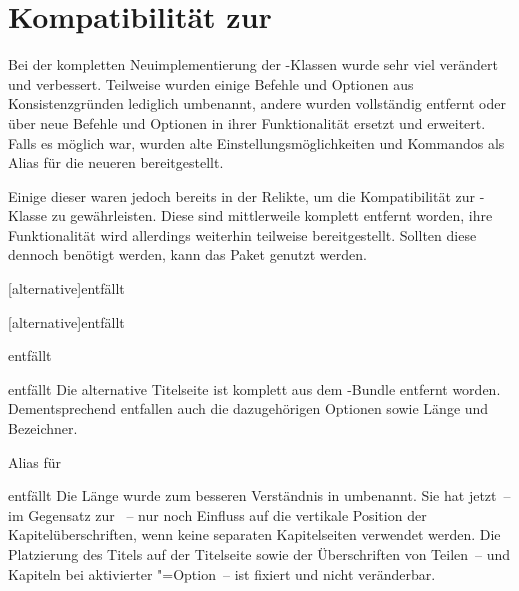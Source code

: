 \documentclass[%
  english,ngerman,%
  headings=optiontoheadandtoc,captions=tableheading,numbers=noenddot,%
  chapterpage,cdfoot,%
]{tudscrman}
\begin{document}
\section{Kompatibilität zur \vTUD}\label{sec:comp}
%

Bei der kompletten Neuimplementierung der \TUDScript-Klassen wurde sehr viel 
verändert und verbessert. Teilweise wurden einige Befehle und Optionen aus 
Konsistenzgründen lediglich umbenannt, andere wurden vollständig entfernt oder 
über neue Befehle und Optionen in ihrer Funktionalität ersetzt und erweitert. 
Falls es möglich war, wurden alte Einstellungsmöglichkeiten und Kommandos als 
Alias für die neueren bereitgestellt.

Einige dieser waren jedoch bereits in der \vTUD Relikte, um die Kompatibilität 
zur -Klasse zu gewährleisten. Diese sind mittlerweile komplett 
entfernt worden, ihre Funktionalität wird allerdings weiterhin teilweise 
bereitgestellt. Sollten diese dennoch benötigt werden, kann das Paket 
 genutzt werden.

\begin{Declaration}{[alternative]}{entfällt}
\begin{Declaration}{[alternative]}{entfällt}
\begin{Declaration}{}{entfällt}
\begin{Declaration}{}{entfällt}
\printdeclarationlist*%
%
%
Die alternative Titelseite ist komplett aus dem \TUDScript-Bundle entfernt 
worden. Dementsprechend entfallen auch die dazugehörigen Optionen sowie Länge 
und Bezeichner.
\end{Declaration}
\end{Declaration}
\end{Declaration}
\end{Declaration}

\begin{Declaration}{}{%
  Alias für %
}
\begin{Declaration}{}{entfällt}
\printdeclarationlist*%
%
Die Länge  wurde zum besseren Verständnis in 
 umbenannt. Sie hat jetzt~-- im Gegensatz zur 
\vTUD~-- nur noch Einfluss auf die vertikale Position der Kapitelüberschriften, 
wenn keine separaten Kapitelseiten verwendet werden. Die Platzierung des Titels 
auf der Titelseite sowie der Überschriften von Teilen~-- und Kapiteln bei 
aktivierter "=Option~-- ist fixiert und nicht veränderbar.
\end{Declaration}
\end{Declaration}
\end{document}
